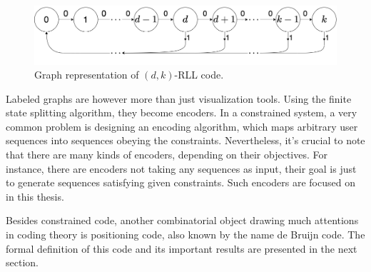 \begin{figure}[htbp]
    \centering
    \includegraphics[scale=0.4]{fig/RLL.png}
    \caption{Graph representation of $(d,k)$-RLL code.}
    \label{fig:d_k_RLL}
\end{figure}

Labeled graphs are however more than just visualization tools. Using the finite state splitting algorithm, they become encoders. In a constrained system, a very common problem is designing an encoding algorithm, which maps arbitrary user sequences into sequences obeying the constraints. Nevertheless, it's crucial to note that there are many kinds of encoders, depending on their objectives. For instance, there are encoders not taking any sequences as input, their goal is just to generate sequences satisfying given constraints. Such encoders are focused on in this thesis. 

Besides constrained code, another combinatorial object drawing much attentions in coding theory is positioning code, also known by the name de Bruijn code. The formal definition of this code and its important results are presented in the next section.




